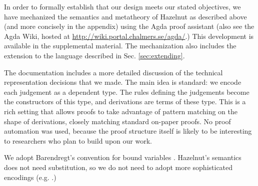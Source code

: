 
In order to
formally establish that our design meets our stated objectives, we have
mechanized the semantics and metatheory of Hazelnut as described above (and more concisely in the appendix) using the Agda proof
assistant \cite{norell:thesis} (also see the Agda Wiki, hosted
at \url{http://wiki.portal.chalmers.se/agda/}.) This development is available in the supplemental material. The mechanization also includes the  extension to the
language described in Sec. \ref{sec:extending}.

The documentation includes a more detailed discussion of the technical
representation decisions that we made. The main idea is standard: we encode
each judgement as a dependent type. The rules defining the judgements
become the constructors of this type, and derivations are terms of these
type. This is a rich setting that allows proofs to take advantage of
pattern matching on the shape of derivations, closely matching standard
on-paper proofs. No proof automation was used, because the proof structure
itself is likely to be interesting to researchers who plan to build upon
our work.

We adopt Barendregt's convention for bound
variables \cite{urban}. Hazelnut's semantics does not need substitution, so
we do not need to adopt more sophisticated encodings
(e.g. \cite{lh09unibind,Pouillard11}.)
